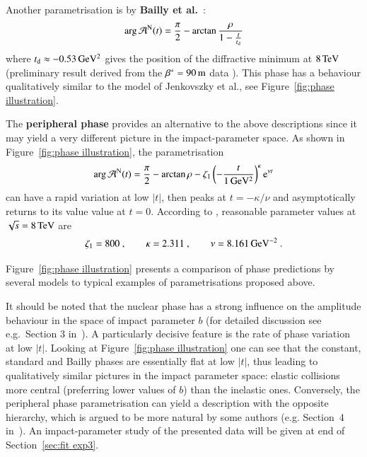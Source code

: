 Another parametrisation is by {\bf Bailly et al.}~\cite{bailly87}:
\begin{equation}
\label{eq:nuc phase bai}
	\arg {\cal A}^{\rm N}(t) = {\pi\over 2} - \arctan {\rho\over 1 - {t\over t_{\rm d}}}
\end{equation}
where $t_{\rm d} \approx -0.53\,{\rm GeV^2}$ gives the position of the diffractive minimum at $8\,{\rm TeV}$ (preliminary result derived from the $\beta^* = 90\,{\rm m}$ data \cite{8tev-90m}). This phase has a behaviour qualitatively similar to the model of Jenkovszky et al., see Figure~\ref{fig:phase illustration}.

The {\bf peripheral phase} \cite{kl94} provides an alternative to the above descriptions since it may yield a very different picture in the impact-parameter space. As shown in Figure~\ref{fig:phase illustration}, the parametrisation
\begin{equation}
\label{eq:nuc phase per}
\arg {\cal A}^{\rm N}(t) = {\pi\over 2} - \arctan\rho - \zeta_1 \left(- {t\over 1\un{GeV^2}} \right)^\kappa \e^{\nu t}
\end{equation}
can have a rapid variation at low $|t|$, then peaks at $t = -\kappa / \nu$ and asymptotically returns to its value value at $t=0$. According to \cite{kl-8tev}, reasonable parameter values at $\sqrt s = 8\,{\rm TeV}$ are
\begin{equation}
\label{eq:nuc phase per val}
	\zeta_1 = 800\ ,\qquad
	\kappa = 2.311\ ,\qquad
	\nu = 8.161\,{\rm GeV^{-2}}\ .
\end{equation}

Figure~\ref{fig:phase illustration} presents a comparison of phase predictions by several models to typical examples of parametrisations proposed above.

It should be noted that the nuclear phase has a strong influence on the amplitude behaviour in the space of impact parameter $b$ (for detailed discussion see e.g.~Section 3 in~\cite{klk02}). A particularly decisive feature is the rate of phase variation at low $|t|$. Looking at Figure~\ref{fig:phase illustration} one can see that the constant, standard and Bailly phases are essentially flat at low $|t|$, thus leading to qualitatively similar pictures in the impact parameter space: elastic collisions more central (preferring lower values of $b$) than the inelastic ones. Conversely, the peripheral phase parametrisation can yield a description with the opposite hierarchy, which is argued to be more natural by some authors (e.g. Section~4 in~\cite{kl96}). An impact-parameter study of the presented data will be given at end of Section~\ref{sec:fit exp3}.

